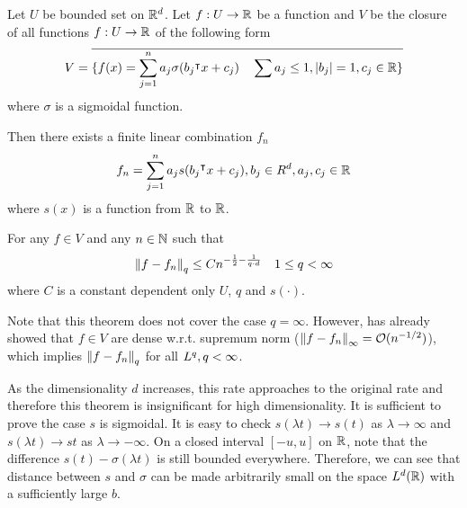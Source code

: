 \begin{theorem}
    \label{thm:improve_barron}
    Let $U$ be bounded set on $\mathbb{R}^d$. Let $f: U \to \mathbb{R}$ be a function and $V$ be
    the closure of all functions $f: U \to \mathbb{R}$ of the following form
    \begin{equation}
        V = \overline{
            \{f(x) = \sum_{j=1}^n a_j \sigma(b_j{}^{\intercal} x + c_j) \quad 
            \sum a_j \leq 1, \left| b_j \right| = 1, c_j \in \mathbb{R} \}
            }
    \end{equation}
    where $\sigma$ is a sigmoidal function.

    Then there exists a finite linear combination $f_n$ 
    \begin{equation}
        f_n = \sum_{j=1}^n a_j s(b_j{}^{\intercal} x + c_j), b_j \in R^d, a_j, c_j \in \mathbb{R}
    \end{equation}
    where $s(x)$ is a function from $\mathbb{R}$ to $\mathbb{R}$.

    For any $f \in V$ and any $n \in \mathbb{N}$ such that 
    \begin{equation}
        \left\| f- f_n \right\|_{q} \leq C n^{-\frac{1}{2} - \frac{1}{q \cdot d}}
        \quad 1 \leq q < \infty
    \end{equation}
    where $C$ is a constant dependent only $U$, $q$ and $s(\cdot)$.
\end{theorem}


Note that this theorem does not cover the case $q = \infty$. However,
\cite{barronUniversalApproximationBounds1993} has already showed that $f\in V$ are
dense w.r.t. supremum norm ($\left\| f - f_n \right\|_{\infty} = \mathcal{O}(n^{-1/2})$), which
implies $\left\| f-f_n \right\|_{q}$ for all $L^{q}, q<\infty$.

As the dimensionality $d$ increases, this rate approaches to the original rate
and therefore this theorem is insignificant for high dimensionality. It is
sufficient to prove the case $s$ is sigmoidal. It is easy to check $s(\lambda t)
\to s(t)$ as $\lambda \to \infty$ and $s(\lambda t) \to s{t}$ as $\lambda \to
-\infty$. On a closed interval $[-u, u]$ on $\mathbb{R}$, note that the difference $s(t)
- \sigma(\lambda t)$ is still bounded everywhere. Therefore, we can see that
distance between $s$ and $\sigma$ can be made arbitrarily small on the space
$L^{d}(\mathbb{R})$ with a sufficiently large $b$.

